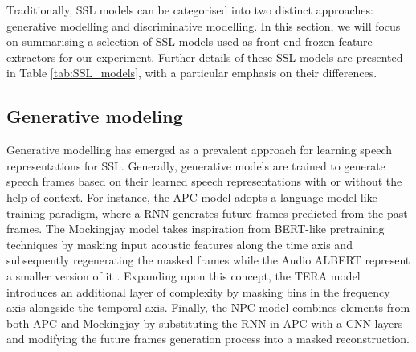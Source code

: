 Traditionally, \ac{SSL} models can be categorised into two distinct approaches: generative modelling and discriminative modelling. In this section, we will focus on summarising a selection of \ac{SSL} models used as front-end frozen feature extractors for our experiment. Further details of these \ac{SSL} models are presented in Table \ref{tab:SSL_models}, with a particular emphasis on their differences.

\subsection{Generative modeling}
Generative modelling has emerged as a prevalent approach for learning speech representations for \ac{SSL}. Generally, generative models are trained to generate speech frames based on their learned speech representations with or without the help of context. For instance, the \ac{APC} model \cite{chung19_interspeech} adopts a language model-like training paradigm, where a \ac{RNN} generates future frames predicted from the past frames. 
The Mockingjay model \cite{mockingjay} takes inspiration from \ac{BERT}-like pretraining techniques by masking input acoustic features along the time axis and subsequently regenerating the masked frames while the Audio ALBERT represent a smaller version of it \cite{chi2021audio}. Expanding upon this concept, the \ac{TERA} model \cite{liu2021tera} introduces an additional layer of complexity by masking bins in the frequency axis alongside the temporal axis. Finally, the \ac{NPC} model \cite{liu21l_interspeech} combines elements from both \ac{APC} and Mockingjay by substituting the \ac{RNN} in \ac{APC} with a \ac{CNN} layers and modifying the future frames generation process into a masked reconstruction.

